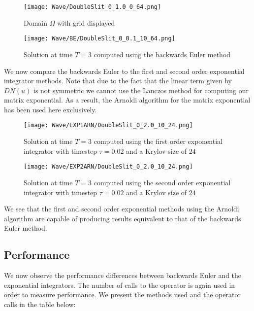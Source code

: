 \begin{figure}[H]
    \centering
    \begin{minipage}{0.49\textwidth}
        \texttt{[image: Wave/DoubleSlit\_0\_1.0\_0\_64.png]} %
        \caption{Domain $\Omega$ with grid displayed}
        \label{fig:waveOmega}
    \end{minipage}\hfill
    \centering
    \begin{minipage}{0.49\textwidth}
        \texttt{[image: Wave/BE/DoubleSlit\_0\_0.1\_10\_64.png]} %
        \caption{Solution at time $T=3$ computed using the backwards Euler method}
        \label{fig:second order 32}
    \end{minipage}\hfill
\end{figure}

We now compare the backwards Euler to the first and second order exponential integrator methods.
Note that due to the fact that the linear term given by $DN(u)$ is not symmetric we cannot use the Lanczos method for computing our matrix exponential.
As a result, the Arnoldi algorithm for the matrix exponential has been used here exclusively.
\begin{figure}[H]
    \centering
    \begin{minipage}{0.49\textwidth}
        \texttt{[image: Wave/EXP1ARN/DoubleSlit\_0\_2.0\_10\_24.png]} %
        \caption{Solution at time $T=3$ computed using the first order exponential integrator with timestep $\tau = 0.02$ and a Krylov size of $24$}
        \label{fig:second order 16}
    \end{minipage}\hfill
    \centering
    \begin{minipage}{0.49\textwidth}
        \texttt{[image: Wave/EXP2ARN/DoubleSlit\_0\_2.0\_10\_24.png]} %
        \caption{Solution at time $T=3$ computed using the second order exponential integrator with timestep $\tau = 0.02$ and a Krylov size of $24$}
        \label{fig:second order 32}
    \end{minipage}\hfill
\end{figure}

We see that the first and second order exponential methods using the Arnoldi algorithm are capable of producing results equivalent to that of the backwards Euler method.

\subsection{Performance}
We now observe the performance differences between backwards Euler and the exponential integrators.
The number of calls to the operator is again used in order to measure performance.
We present the methods used and the operator calls in the table below:

